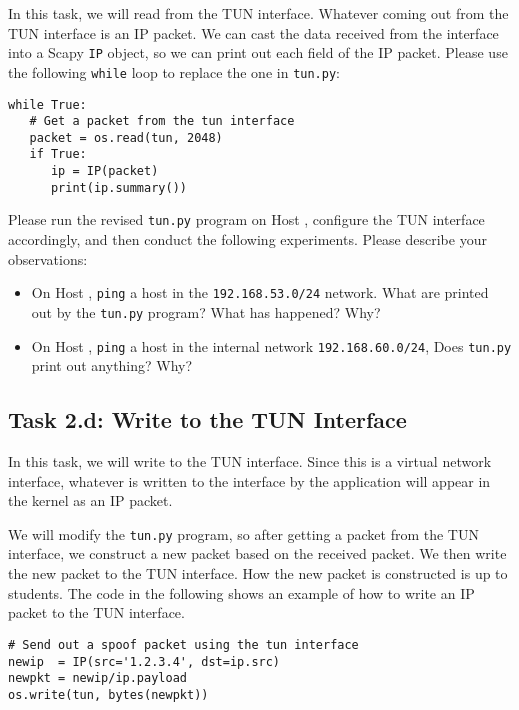 In this task, we will read from the TUN interface. Whatever coming out from the TUN interface 
is an IP packet. We can cast the data received from the interface into a Scapy \texttt{IP} 
object, so we can print out each field of the IP packet. Please use the 
following \texttt{while} loop to replace the one in \texttt{tun.py}:  

\begin{lstlisting}
while True:
   # Get a packet from the tun interface
   packet = os.read(tun, 2048)
   if True:
      ip = IP(packet)
      print(ip.summary())
\end{lstlisting}


Please run the revised \texttt{tun.py} program on Host \hostu, configure the 
TUN interface accordingly, and then 
conduct the following experiments. Please 
describe your observations: 


\begin{itemize}
\item On Host \hostu, \texttt{ping} a host in the \texttt{192.168.53.0/24} network. 
What are printed out by the \texttt{tun.py} program? What has happened? Why?   

\item On Host \hostu,  \texttt{ping} a host in the internal network \texttt{192.168.60.0/24}, 
Does \texttt{tun.py} print out anything? Why?   
\end{itemize}
 



\subsection{Task 2.d: Write to the TUN Interface} 


In this task, we will write to the TUN interface. Since this is a virtual network 
interface, whatever is written to the interface by the application will
appear in the kernel as an IP packet.


We will modify the \texttt{tun.py} program, so after getting a packet from the TUN interface, 
we construct a new packet based 
on the received packet. We then write the new packet to the TUN interface.
How the new packet is constructed is up to students. The code in the following
shows an example of how to write an IP packet to the TUN interface. 


\begin{lstlisting}
# Send out a spoof packet using the tun interface
newip  = IP(src='1.2.3.4', dst=ip.src)
newpkt = newip/ip.payload
os.write(tun, bytes(newpkt))
\end{lstlisting}

